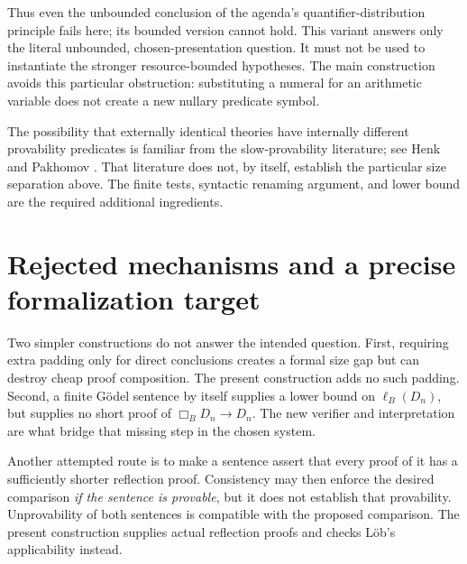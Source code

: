 \documentclass[11pt]{article}
\theoremstyle{remark}
\begin{document}
Thus even the unbounded conclusion of the agenda's quantifier-distribution
principle fails here; its bounded version cannot hold. This variant answers
only the literal unbounded, chosen-presentation question. It must not be used
to instantiate the stronger resource-bounded hypotheses. The main
construction avoids this particular obstruction: substituting a numeral for
an arithmetic variable does not create a new nullary predicate symbol.

The possibility that externally identical theories have internally different
provability predicates is familiar from the slow-provability literature; see
Henk and Pakhomov \cite{henk-pakhomov}. That literature does not, by itself,
establish the particular size separation above. The finite tests, syntactic
renaming argument, and lower bound are the required additional ingredients.

\section{Rejected mechanisms and a precise formalization target}

Two simpler constructions do not answer the intended question. First,
requiring extra padding only for direct conclusions creates a formal size
gap but can destroy cheap proof composition. The present construction
adds no such padding. Second, a finite G\"odel sentence by itself supplies
a lower bound on $\ell_B(D_n)$, but supplies no short proof of
$\Box_BD_n\to D_n$. The new verifier and interpretation are what bridge
that missing step in the chosen system.

Another attempted route is to make a sentence assert that every proof of
it has a sufficiently shorter reflection proof. Consistency may then enforce
the desired comparison \emph{if the sentence is provable}, but it does not
establish that provability. Unprovability of both sentences is compatible
with the proposed comparison. The present construction supplies actual
reflection proofs and checks L\"ob's applicability instead.
\end{document}
